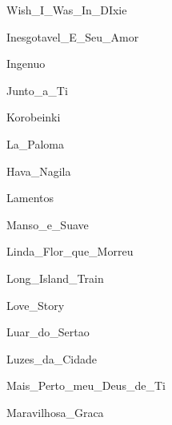 \documentclass{scrartcl}
\begin{document}

{Wish_I_Was_In_DIxie}


{Inesgotavel_E_Seu_Amor}


{Ingenuo}


{Junto_a_Ti}


{Korobeinki}


{La_Paloma}


{Hava_Nagila}


{Lamentos}


{Manso_e_Suave}


{Linda_Flor_que_Morreu}


{Long_Island_Train}


{Love_Story}


{Luar_do_Sertao}


{Luzes_da_Cidade}


{Mais_Perto_meu_Deus_de_Ti}


{Maravilhosa_Graca}
\end{document}
